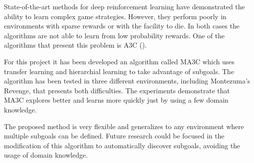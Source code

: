 
State-of-the-art methods for deep reinforcement learning have demonstrated the ability to learn complex game strategies.
However, they perform poorly in environments with sparse rewards or with the facility to die.
In both cases the algorithms are not able to learn from low probability rewards.
One of the algorithms that present this problem is \acf{A3C} (\cite{mnih2016A3C}).

For this project it has been developed an algorithm called \acf{MA3C} which uses transfer learning and hierarchial learning
to take advantage of subgoals.
The algorithm has been tested in three different environments, including Montezuma's Revenge, that presents both difficulties.
The experiments demonstrate that \ac{MA3C} explores better and learns more quickly just by using a few domain knowledge.

The proposed method is very flexible and generalizes to any environment where multiple subgoals can be defined.
Future research could be focused in the modification of this algorithm to automatically discover subgoals,
avoiding the usage of domain knowledge.